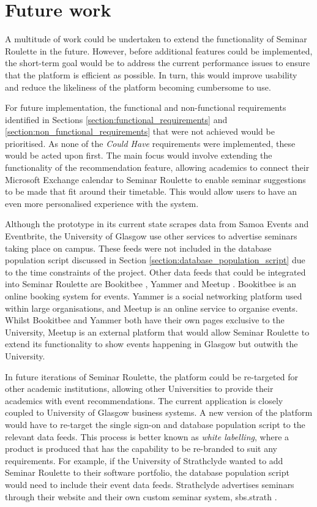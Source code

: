 \documentclass{l4proj}
\begin{document}
\section{Future work}
\label{section:future_work}

A multitude of work could be undertaken to extend the functionality of Seminar Roulette in the future. However, before additional features could be implemented, the short-term goal would be to address the current performance issues to ensure that the platform is efficient as possible. In turn, this would improve usability and reduce the likeliness of the platform becoming cumbersome to use.

For future implementation, the functional and non-functional requirements identified in Sections \ref{section:functional_requirements} and \ref{section:non_functional_requirements} that were not achieved would be prioritised. As none of the \emph{Could Have} requirements were implemented, these would be acted upon first. The main focus would involve extending the functionality of the recommendation feature, allowing academics to connect their Microsoft Exchange calendar to Seminar Roulette to enable seminar suggestions to be made that fit around their timetable. This would allow users to have an even more personalised experience with the system.

Although the prototype in its current state scrapes data from Samoa Events and Eventbrite, the University of Glasgow use other services to advertise seminars taking place on campus. These feeds were not included in the database population script discussed in Section \ref{section:database_population_script} due to the time constraints of the project. Other data feeds that could be integrated into Seminar Roulette are Bookitbee \citep{bookitbee}, Yammer \citep{yammer} and Meetup \citep{meetup}. Bookitbee is an online booking system for events. Yammer is a social networking platform used within large organisations, and Meetup is an online service to organise events. Whilst Bookitbee and Yammer both have their own pages exclusive to the University, Meetup is an external platform that would allow Seminar Roulette to extend its functionality to show events happening in Glasgow but outwith the University.

In future iterations of Seminar Roulette, the platform could be re-targeted for other academic institutions, allowing other Universities to provide their academics with event recommendations. The current application is closely coupled to University of Glasgow business systems. A new version of the platform would have to re-target the single sign-on and database population script to the relevant data feeds. This process is better known as \emph{white labelling}, where a product is produced that has the capability to be re-branded to suit any requirements. For example, if the University of Strathclyde wanted to add Seminar Roulette to their software portfolio, the database population script would need to include their event data feeds. Strathclyde advertises seminars through their website and their own custom seminar system, sbs.strath \citep{sbs.strath}.
\end{document}
